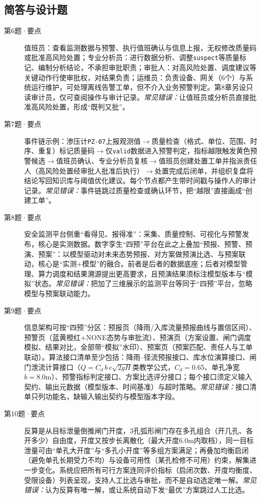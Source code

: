 \subsection*{简答与设计题}
\begin{description}
  \item[第6题·要点] 值班员：查看监测数据与预警、执行值班确认与信息上报，无权修改质量码或批准高风险处置；专业分析员：进行数据分析、调整\texttt{suspect}等质量标记、编制分析结论，不承担审批职责；审批人：对高风险处置、调度建议等关键动作行使审批权，对结果负责；运维员：负责设备、网关（6个）与系统运行维护，可处理离线告警工单，但不介入业务预警判定。第8章另设只读审计员，仅可查阅操作与审计记录。\textit{常见错误：}让值班员或分析员直接批准高风险处置，形成“既判又批”。
  \item[第7题·要点] 事件链示例：渗压计\texttt{PZ-07}上报观测值$\rightarrow$质量检查（格式、单位、范围、时序、重复）标记质量码$\rightarrow$仅\texttt{valid}数据进入预警判定，指标越限触发黄色预警候选$\rightarrow$值班员确认、专业分析员复核$\rightarrow$值班员创建处置工单并指派责任人（高风险处置经审批人批准后执行）$\rightarrow$处置完成后闭单，并组织复盘将结论写回知识库与阈值优化建议。每个节点都产生带时间戳与操作人的审计记录。\textit{常见错误：}事件链跳过质量检查或确认环节，把“越限”直接画成“创建工单”。
  \item[第8题·要点] 安全监测平台侧重“看得见、报得准”：采集、质量控制、可视化与预警发布，核心是实测数据。数字孪生“四预”平台在此之上叠加“预报、预警、预演、预案”：以模型驱动对未来态势预报、对方案做预演比选、与预案联动，核心是“实测+模型”的融合。前者是后者的数据底座；后者对模型管理、算力调度和结果溯源提出更高要求，且预演结果须标注模型版本与“模拟”状态。\textit{常见错误：}把加了三维展示的监测平台等同于“四预”平台，忽略模型与预案联动能力。
  \item[第9题·要点] 信息架构可按“四预”分区：预报页（降雨/入库流量预报曲线与置信区间）、预警页（蓝黄橙红+NONE态势与审批流）、预演页（方案设置、闸门调度模拟、结果对比，全部带“模拟”水印）、预案页（预案匹配、责任人与工单联动）。算法接口清单至少包括：降雨--径流预报接口、库水位演算接口、闸门泄流计算接口（$Q=C_d\,b\,e\sqrt{2gH}$类教学公式，$C_d=0.65$、单孔净宽$b=8.0$m）、预警指标判定接口、方案比选评分接口；每个接口须定义输入契约、输出元数据（模型版本、时间基准）与超时策略。\textit{常见错误：}接口清单只列功能名，缺输入输出契约与模型版本字段。
  \item[第10题·要点] 反算是从目标泄量倒推闸门开度，3孔弧形闸门存在多孔组合（开几孔、各开多少）自由度，开度又按步长离散化（最大开度6.0m内取档），同一目标泄量可由“单孔大开度”与“多孔小开度”等多组方案满足；再叠加均衡启闭（避免单孔长期受力不均）与设备可用性（某孔检修不可用）约束，解集进一步变化。系统应把所有可行方案连同评价指标（启闭次数、开度均衡度、受限设备）列表呈现，支持人工比选与审批，而不是自动选定唯一解。\textit{常见错误：}认为反算有唯一解，或让系统自动下发“最优”方案跳过人工比选。

\end{description}
